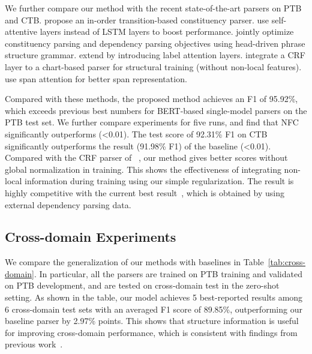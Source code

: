 \documentclass[11pt]{article}
\begin{document}
We further compare our method with the recent state-of-the-art parsers on PTB and CTB. 
\citet{liu-zhang-2017-order} propose an in-order transition-based constituency parser. 
\citet{san-constituency} use self-attentive layers instead of LSTM layers to boost performance. 
\citet{head-driven} jointly optimize constituency parsing and dependency parsing objectives using head-driven phrase structure grammar. 
\citet{label-attention-parsing} extend \citet{head-driven} by introducing label attention layers.
\citet{constituency-crf} integrate a CRF layer to a chart-based parser for structural training (without non-local features). 
\citet{span-attention} use span attention for better span representation.



Compared with these methods, the proposed method achieves an F1 of 95.92\%, which exceeds previous best numbers for BERT-based single-model parsers on the PTB test set. We further compare  experiments for five runs, and find that NFC significantly outperforms \citet{san-constituency} (\textless0.01).
The test score of 92.31\% F1 on CTB significantly outperforms the result (91.98\% F1) of the baseline (\textless0.01).
Compared with the CRF parser of ~\citet{constituency-crf}, our method gives better scores without global normalization in training. 
This shows the effectiveness of integrating non-local information during training using our simple regularization. 
The result is highly competitive with the current best result~\cite{label-attention-parsing}, which is obtained by using external dependency parsing data. 


\subsection{Cross-domain Experiments}

We compare the generalization of our methods with baselines in Table~\ref{tab:cross-domain}. 
In particular, all the parsers are trained on PTB training and validated on PTB development, and are tested on cross-domain test in the zero-shot setting. 
As shown in the table, our model achieves 5 best-reported results among 6 cross-domain test sets with an averaged F1 score of 89.85\%, outperforming our baseline parser by 2.97\% points. 
This shows that structure information is useful for improving cross-domain performance, which is consistent with findings from previous work~\cite{cross-domain-parser}.
\end{document}
